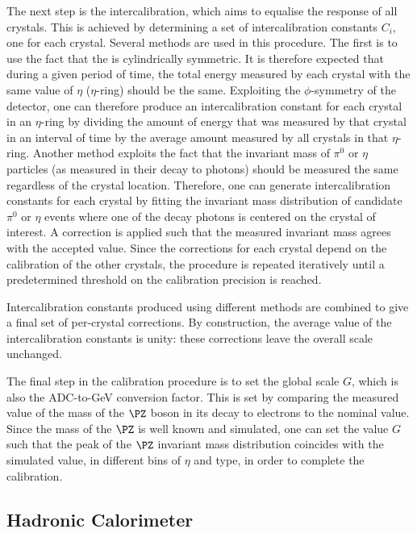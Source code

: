 The next step is the intercalibration, which aims to equalise the response of all crystals. This is achieved by determining a set of intercalibration constants $C_{i}$, one for each crystal. Several methods are used in this procedure. The first is to use the fact that the \CMS \ECAL is cylindrically symmetric. It is therefore expected that during a given period of time, the total energy measured by each crystal with the same value of $\eta$ ($\eta$-ring) should be the same. Exploiting the $\phi$-symmetry of the detector, one can therefore produce an intercalibration constant for each crystal in an $\eta$-ring by dividing the amount of energy that was measured by that crystal in an interval of time by the average amount measured by all crystals in that $\eta$-ring. Another method exploits the fact that the invariant mass of $\pi^0$ or $\eta$ particles (as measured in their decay to photons) should be measured the same regardless of the crystal location. Therefore, one can generate intercalibration constants for each crystal by fitting the invariant mass distribution of candidate $\pi^0$ or $\eta$ events where one of the decay photons is centered on the crystal of interest. A correction is applied such that the measured invariant mass agrees with the accepted value. Since the corrections for each crystal depend on the calibration of the other crystals, the procedure is repeated iteratively until a predetermined threshold on the calibration precision is reached.

Intercalibration constants produced using different methods are combined to give a final set of per-crystal corrections. By construction, the average value of the intercalibration constants is unity: these corrections leave the overall scale unchanged.

The final step in the calibration procedure is to set the global scale $G$, which is also the ADC-to-GeV conversion factor. This is set by comparing the measured value of the mass of the $\PZ$ boson in its decay to electrons to the nominal value. Since the mass of the $\PZ$ is well known and simulated, one can set the value $G$ such that the peak of the $\PZ$ invariant mass distribution coincides with the simulated value, in different bins of $\eta$ and \SC type, in order to complete the calibration.


\subsection{Hadronic Calorimeter}
\label{sec:cms:hcal}

